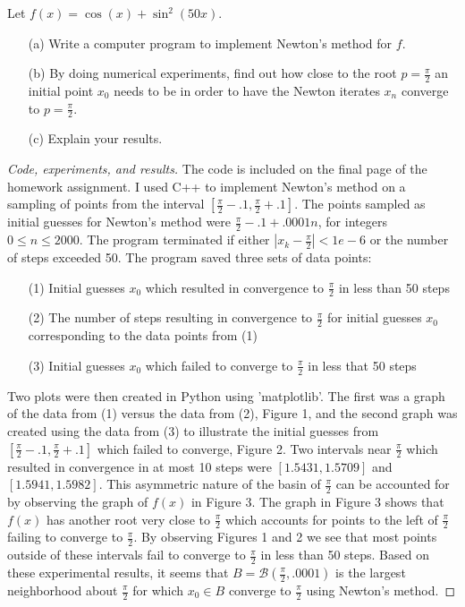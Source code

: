 \documentclass[8pt]{article}
\theoremstyle{definition}
\newenvironment{exercise}[1]
  {\renewcommand\theinnerexercise{#1}\innerexercise}
  {\endinnerexercise}
\begin{document}
\begin{exercise}{2}
	Let $f(x) = \cos(x) + \sin^{2} (50 x)$.
	\begin{enumerate}
		\item[(a)] Write a computer program to implement Newton's method for $f$.
		\item[(b)] By doing numerical experiments, find out how close to the root $p = \frac{\pi}{2}$ an initial point $x_0$ needs to be in order to have the Newton iterates $x_n$ converge to $p = \frac{\pi}{2}$.
		\item[(c)] Explain your results.
	\end{enumerate}
\end{exercise}
\begin{proof}[Code, experiments, and results]
The code is included on the final page of the homework assignment. I used C++ to implement Newton's method on a sampling of points from the interval $\left[ \frac{\pi}{2} - .1, \frac{\pi}{2} + .1 \right]$. The points sampled as initial guesses for Newton's method were $\frac{\pi}{2} - .1 + .0001n$, for integers $0 \leq n \leq 2000$. The program terminated if either $|x_k - \frac{\pi}{2}| < 1e-6$ or the number of steps exceeded 50. The program saved three sets of data points: 
\begin{enumerate}
	\item [(1)] Initial guesses $x_0$ which resulted in convergence to $\frac{\pi}{2}$ in less than 50 steps
	\item [(2)] The number of steps resulting in convergence to $\frac{\pi}{2}$ for initial guesses $x_0$ corresponding to the data points from (1)
	\item [(3)] Initial guesses $x_0$ which failed to converge to $\frac{\pi}{2}$ in less that 50 steps
\end{enumerate}
Two plots were then created in Python using 'matplotlib'. The first was a graph of the data from (1) versus the data from (2), Figure 1, and the second graph was created using the data from (3) to illustrate the initial guesses from $\left[ \frac{\pi}{2} - .1, \frac{\pi}{2} + .1 \right]$ which failed to converge, Figure 2. Two intervals near $\frac{\pi}{2}$ which resulted in convergence in at most 10 steps were $[1.5431, 1.5709]$ and $[1.5941, 1.5982]$. This asymmetric nature of the basin of $\frac{\pi}{2}$ can be accounted for by observing the graph of $f(x)$ in Figure 3. The graph in Figure 3 shows that $f(x)$ has another root very close to $\frac{\pi}{2}$ which accounts for points to the left of $\frac{\pi}{2}$ failing to converge to $\frac{\pi}{2}$. By observing Figures 1 and 2 we see that most points outside of these intervals fail to converge to $\frac{\pi}{2}$ in less than 50 steps. Based on these experimental results, it seems that $B = \mathcal{B} \left( \frac{\pi}{2}, .0001 \right)$ is the largest neighborhood about $\frac{\pi}{2}$ for which $x_0 \in B$ converge to $\frac{\pi}{2}$ using Newton's method.


\end{proof}
\end{document}
